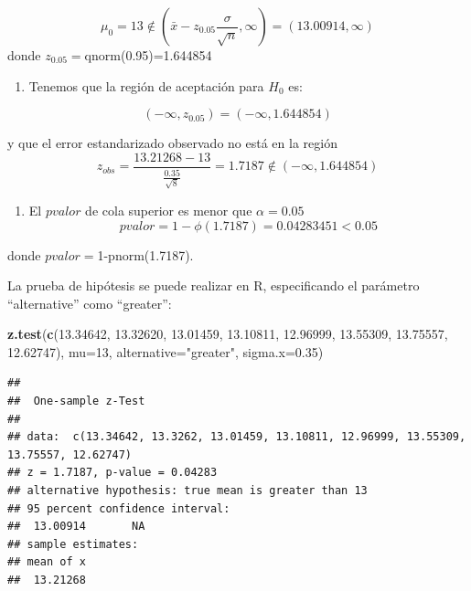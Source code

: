 \documentclass[
]{book}
\newenvironment{Shaded}{\begin{snugshade}}{\end{snugshade}}
\newcommand{\AttributeTok}[1]{\textcolor[rgb]{0.13,0.29,0.53}{#1}}
\newcommand{\DecValTok}[1]{\textcolor[rgb]{0.00,0.00,0.81}{#1}}
\newcommand{\FloatTok}[1]{\textcolor[rgb]{0.00,0.00,0.81}{#1}}
\newcommand{\FunctionTok}[1]{\textcolor[rgb]{0.13,0.29,0.53}{\textbf{#1}}}
\newcommand{\NormalTok}[1]{#1}
\newcommand{\StringTok}[1]{\textcolor[rgb]{0.31,0.60,0.02}{#1}}
\providecommand{\tightlist}{%
  \setlength{\itemsep}{0pt}\setlength{\parskip}{0pt}}
\begin{document}
\[\mu_0=13 \notin (\bar{x}-z_{0.05} \frac{\sigma}{\sqrt{n}}, \infty)=(13.00914, \infty)\]
donde \(z_{0.05}=\)qnorm(0.95)=1.644854

\begin{enumerate}
\def\labelenumi{\arabic{enumi}.}
\setcounter{enumi}{1}
\tightlist
\item
  Tenemos que la región de aceptación para \(H_0\) es:
\end{enumerate}

\[(-\infty, z_{0.05})=( -\infty, 1.644854)\]

y que el error estandarizado observado no está en la región
\[z_{obs} = \frac{13.21268-13}{\frac{0.35}{\sqrt{8}}}=1.7187 \notin ( -\infty, 1.644854)\]

\begin{enumerate}
\def\labelenumi{\arabic{enumi}.}
\setcounter{enumi}{2}
\tightlist
\item
  El \(pvalor\) de cola superior es menor que \(\alpha=0.05\)
  \[pvalor=1-\phi(1.7187)=0.04283451 <0.05\]
\end{enumerate}

donde \(pvalor=\)1-pnorm(1.7187).

La prueba de hipótesis se puede realizar en R, especificando el parámetro ``alternative'' como ``greater'':

\begin{Shaded}
\begin{Highlighting}[]
\FunctionTok{z.test}\NormalTok{(}\FunctionTok{c}\NormalTok{(}\FloatTok{13.34642}\NormalTok{, }\FloatTok{13.32620}\NormalTok{, }\FloatTok{13.01459}\NormalTok{, }\FloatTok{13.10811}\NormalTok{,}
         \FloatTok{12.96999}\NormalTok{, }\FloatTok{13.55309}\NormalTok{, }\FloatTok{13.75557}\NormalTok{, }\FloatTok{12.62747}\NormalTok{), }
       \AttributeTok{mu=}\DecValTok{13}\NormalTok{, }\AttributeTok{alternative=}\StringTok{"greater"}\NormalTok{, }\AttributeTok{sigma.x=}\FloatTok{0.35}\NormalTok{)}
\end{Highlighting}
\end{Shaded}

\begin{verbatim}
## 
##  One-sample z-Test
## 
## data:  c(13.34642, 13.3262, 13.01459, 13.10811, 12.96999, 13.55309,     13.75557, 12.62747)
## z = 1.7187, p-value = 0.04283
## alternative hypothesis: true mean is greater than 13
## 95 percent confidence interval:
##  13.00914       NA
## sample estimates:
## mean of x 
##  13.21268
\end{verbatim}
\end{document}
